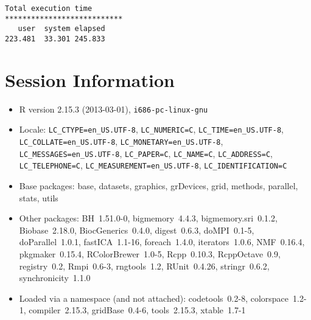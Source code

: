 \documentclass[10pt]{article}
\begin{document}
\begin{verbatim}
Total execution time
***************************
   user  system elapsed 
223.481  33.301 245.833 

\end{verbatim}

\section*{Session Information}
\begin{itemize}\raggedright
  \item R version 2.15.3 (2013-03-01), \verb|i686-pc-linux-gnu|
  \item Locale: \verb|LC_CTYPE=en_US.UTF-8|, \verb|LC_NUMERIC=C|, \verb|LC_TIME=en_US.UTF-8|, \verb|LC_COLLATE=en_US.UTF-8|, \verb|LC_MONETARY=en_US.UTF-8|, \verb|LC_MESSAGES=en_US.UTF-8|, \verb|LC_PAPER=C|, \verb|LC_NAME=C|, \verb|LC_ADDRESS=C|, \verb|LC_TELEPHONE=C|, \verb|LC_MEASUREMENT=en_US.UTF-8|, \verb|LC_IDENTIFICATION=C|
  \item Base packages: base, datasets, graphics, grDevices, grid,
    methods, parallel, stats, utils
  \item Other packages: BH~1.51.0-0, bigmemory~4.4.3,
    bigmemory.sri~0.1.2, Biobase~2.18.0, BiocGenerics~0.4.0,
    digest~0.6.3, doMPI~0.1-5, doParallel~1.0.1, fastICA~1.1-16,
    foreach~1.4.0, iterators~1.0.6, NMF~0.16.4, pkgmaker~0.15.4,
    RColorBrewer~1.0-5, Rcpp~0.10.3, RcppOctave~0.9, registry~0.2,
    Rmpi~0.6-3, rngtools~1.2, RUnit~0.4.26, stringr~0.6.2,
    synchronicity~1.1.0
  \item Loaded via a namespace (and not attached): codetools~0.2-8,
    colorspace~1.2-1, compiler~2.15.3, gridBase~0.4-6, tools~2.15.3,
    xtable~1.7-1
\end{itemize}
\end{document}
